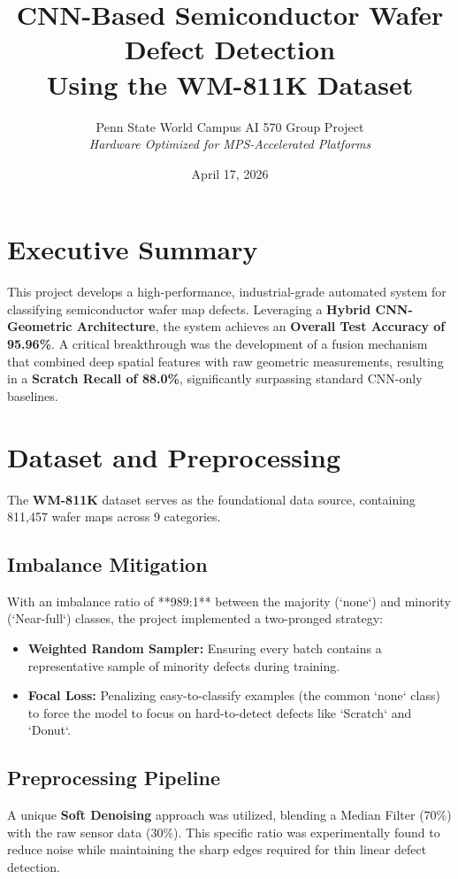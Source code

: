 \documentclass[11pt,a4paper]{article}
\title{\textbf{CNN-Based Semiconductor Wafer Defect Detection \\ Using the WM-811K Dataset}}
\author{Penn State World Campus AI 570 Group Project \\ \textit{Hardware Optimized for MPS-Accelerated Platforms}}
\date{April 17, 2026}
\begin{document}
\maketitle

\section{Executive Summary}
This project develops a high-performance, industrial-grade automated system for classifying semiconductor wafer map defects. Leveraging a \textbf{Hybrid CNN-Geometric Architecture}, the system achieves an \textbf{Overall Test Accuracy of 95.96\%}. A critical breakthrough was the development of a fusion mechanism that combined deep spatial features with raw geometric measurements, resulting in a \textbf{Scratch Recall of 88.0\%}, significantly surpassing standard CNN-only baselines.

\section{Dataset and Preprocessing}
The \textbf{WM-811K} dataset serves as the foundational data source, containing 811,457 wafer maps across 9 categories. 

\subsection{Imbalance Mitigation}
With an imbalance ratio of **989:1** between the majority (`none`) and minority (`Near-full`) classes, the project implemented a two-pronged strategy:
\begin{itemize}
    \item \textbf{Weighted Random Sampler:} Ensuring every batch contains a representative sample of minority defects during training.
    \item \textbf{Focal Loss:} Penalizing easy-to-classify examples (the common `none` class) to force the model to focus on hard-to-detect defects like `Scratch` and `Donut`.
\end{itemize}

\subsection{Preprocessing Pipeline}
A unique \textbf{Soft Denoising} approach was utilized, blending a Median Filter (70\%) with the raw sensor data (30\%). This specific ratio was experimentally found to reduce noise while maintaining the sharp edges required for thin linear defect detection.
\end{document}

